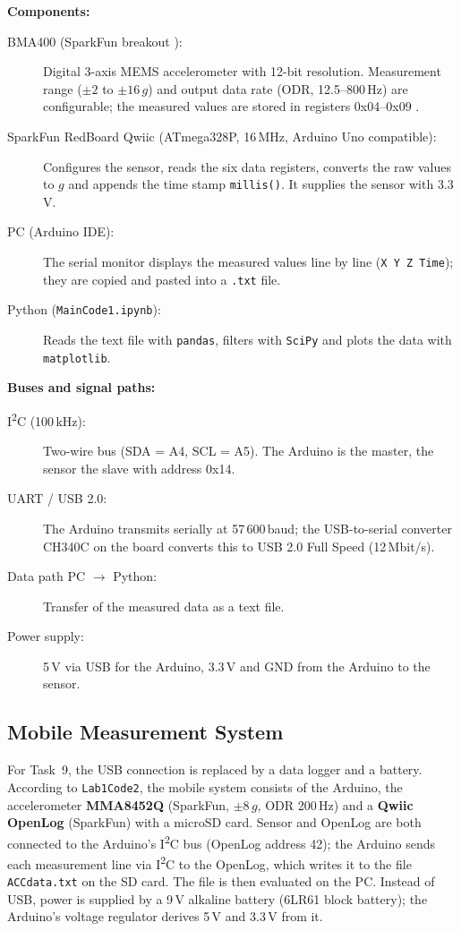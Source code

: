 \documentclass[a4paper,oneside,10pt]{article}
\begin{document}
\textbf{Components:}
\begin{description}
    \item[BMA400 (SparkFun breakout \cite{sparkfun}):] Digital 3-axis MEMS accelerometer with
    12-bit resolution. Measurement range ($\pm 2$ to $\pm 16\,g$) and output data rate (ODR, 12.5--800\,Hz)
    are configurable; the measured values are stored in registers 0x04--0x09 \cite{bma400}.
    \item[SparkFun RedBoard Qwiic (ATmega328P, 16\,MHz, Arduino Uno compatible):] Configures the sensor, reads the six
    data registers, converts the raw values to $g$ and appends the time stamp
    \texttt{millis()}. It supplies the sensor with 3.3\,V.
    \item[PC (Arduino IDE):] The serial monitor displays the measured values line by line
    (\texttt{X Y Z Time}); they are copied and pasted into a \texttt{.txt} file.
    \item[Python (\texttt{MainCode1.ipynb}):] Reads the text file with \texttt{pandas},
    filters with \texttt{SciPy} \cite{scipy} and plots the data with \texttt{matplotlib}.
\end{description}

\textbf{Buses and signal paths:}
\begin{description}
    \item[I\textsuperscript{2}C (100\,kHz):] Two-wire bus (SDA = A4, SCL = A5). The Arduino is
    the master, the sensor the slave with address 0x14.
    \item[UART / USB 2.0:] The Arduino transmits serially at 57\,600\,baud; the USB-to-serial converter
    CH340C on the board converts this to USB 2.0 Full Speed (12\,Mbit/s).
    \item[Data path PC $\rightarrow$ Python:] Transfer of the measured data as a text file.
    \item[Power supply:] 5\,V via USB for the Arduino, 3.3\,V and GND from the Arduino
    to the sensor.
\end{description}

\subsection{Mobile Measurement System}

For Task~9, the USB connection is replaced by a data logger and a battery.
According to \texttt{Lab1Code2}, the mobile system consists of the Arduino, the
accelerometer \textbf{MMA8452Q} (SparkFun, $\pm 8\,g$, ODR 200\,Hz) and
a \textbf{Qwiic OpenLog} (SparkFun) with a microSD card. Sensor and OpenLog are
both connected to the Arduino's I\textsuperscript{2}C bus (OpenLog address 42); the Arduino
sends each measurement line via I\textsuperscript{2}C to the OpenLog, which writes it to the file
\texttt{ACCdata.txt} on the SD card. The file is then evaluated on the PC.
Instead of USB, power is supplied by a 9\,V alkaline battery
(6LR61 block battery); the Arduino's voltage regulator derives 5\,V and 3.3\,V from it.
\end{document}
